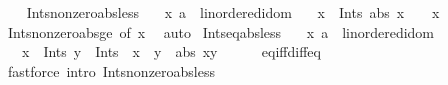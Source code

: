 \begin{isabellebody}
%
\endisatagproof
{\isafoldproof}%
%
\isadelimproof
\isanewline
%
\endisadelimproof
\ \ \isanewline
{}\isamarkupfalse%
\ Ints{\isacharunderscore}{\kern0pt}nonzero{\isacharunderscore}{\kern0pt}abs{\isacharunderscore}{\kern0pt}less{}{\isacharcolon}{\kern0pt}\isanewline
\ \ \ x{\isacharcolon}{\kern0pt}{\isacharcolon}{\kern0pt}\ {\isachardoublequoteopen}{\isacharprime}{\kern0pt}a\ {\isacharcolon}{\kern0pt}{\isacharcolon}{\kern0pt}\ linordered{\isacharunderscore}{\kern0pt}idom{\isachardoublequoteclose}\isanewline
\ \ \ {\isachardoublequoteopen}{\isasymlbrakk}x\ {\isasymin}\ Ints{\isacharsemicolon}{\kern0pt}\ abs\ x\ {\isacharless}{\kern0pt}\ {}{\isasymrbrakk}\ {\isasymLongrightarrow}\ x\ {\isacharequal}{\kern0pt}\ {}{\isachardoublequoteclose}\isanewline
%
\isadelimproof
\ \ \ \ %
\endisadelimproof
%
\isatagproof
{}\isamarkupfalse%
\ Ints{\isacharunderscore}{\kern0pt}nonzero{\isacharunderscore}{\kern0pt}abs{\isacharunderscore}{\kern0pt}ge{}\ {\isacharbrackleft}{\kern0pt}of\ x{\isacharbrackright}{\kern0pt}\ \isamarkupfalse%
\ auto%
\endisatagproof
{\isafoldproof}%
%
\isadelimproof
\isanewline
%
\endisadelimproof
\isanewline
{}\isamarkupfalse%
\ Ints{\isacharunderscore}{\kern0pt}eq{\isacharunderscore}{\kern0pt}abs{\isacharunderscore}{\kern0pt}less{}{\isacharcolon}{\kern0pt}\isanewline
\ \ \ x{\isacharcolon}{\kern0pt}{\isacharcolon}{\kern0pt}\ {\isachardoublequoteopen}{\isacharprime}{\kern0pt}a\ {\isacharcolon}{\kern0pt}{\isacharcolon}{\kern0pt}\ linordered{\isacharunderscore}{\kern0pt}idom{\isachardoublequoteclose}\isanewline
\ \ \ {\isachardoublequoteopen}{\isasymlbrakk}x\ {\isasymin}\ Ints{\isacharsemicolon}{\kern0pt}\ y\ {\isasymin}\ Ints{\isasymrbrakk}\ {\isasymLongrightarrow}\ x\ {\isacharequal}{\kern0pt}\ y\ {\isasymlongleftrightarrow}\ abs\ {\isacharparenleft}{\kern0pt}x{\isacharminus}{\kern0pt}y{\isacharparenright}{\kern0pt}\ {\isacharless}{\kern0pt}\ {}{\isachardoublequoteclose}\isanewline
%
\isadelimproof
\ \ %
\endisadelimproof
%
\isatagproof
{}\isamarkupfalse%
\ eq{\isacharunderscore}{\kern0pt}iff{\isacharunderscore}{\kern0pt}diff{\isacharunderscore}{\kern0pt}eq{\isacharunderscore}{\kern0pt}{}\ \isamarkupfalse%
\ {\isacharparenleft}{\kern0pt}fastforce\ intro{\isacharcolon}{\kern0pt}\ Ints{\isacharunderscore}{\kern0pt}nonzero{\isacharunderscore}{\kern0pt}abs{\isacharunderscore}{\kern0pt}less{}{\isacharparenright}{\kern0pt}%

\end{isabellebody}
